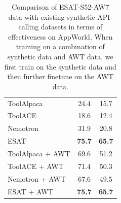 \begin{table}[t!]
\begin{minipage}[c]{0.49\linewidth}
\begin{tabular}[c]{lcc}
ToolAlpaca           &  24.4    &   15.7   \\
ToolACE              & 18.6     & 12.4     \\
Nemotron             &  31.9    &  20.8    \\
\textsc{ESAT}   & \bf 75.7 & \bf 65.7 \\
\midrule
ToolAlpaca + AWT     & 69.6 & 51.2 \\
ToolACE + AWT        & 71.4 & 50.3 \\
Nemotron + AWT       & 67.6 & 49.5 \\
\textsc{ESAT} + AWT   & \bf 75.7 & \bf 65.7 \\
\bottomrule
\end{tabular}
\end{minipage}
\caption{Comparison of ESAT-S52-AW7 data with existing synthetic API-calling datasets in terms of effectiveness on AppWorld. When training on a combination of synthetic data and AWT data, we first train on the synthetic data and then further finetune on the AWT data.}
\label{tab:appworld_baseline_comparison}
\end{table}
